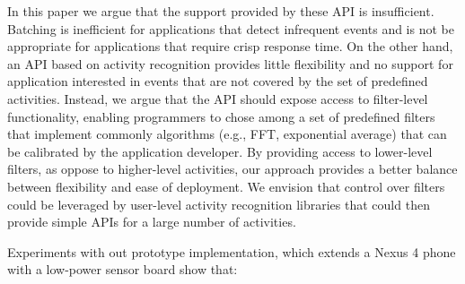 In this paper we argue that the support provided by these API is
insufficient.  Batching is inefficient for applications that detect
infrequent events and is not be appropriate for applications that
require crisp response time.  On the other hand, an API based on
activity recognition provides little flexibility and no support for
application interested in events that are not covered by the set of
predefined activities.  Instead, we argue that the API should expose
access to filter-level functionality, enabling programmers to chose
among a set of predefined filters that implement commonly algorithms
(e.g., FFT, exponential average) that can be calibrated by the
application developer.  By providing access to lower-level filters, as
oppose to higher-level activities, our approach provides a better
balance between flexibility and ease of deployment.  We envision that
control over filters could be leveraged by user-level activity
recognition libraries that could then provide simple APIs for a large
number of activities.

Experiments with out prototype implementation, which extends a Nexus 4
phone with a low-power sensor board show that:

